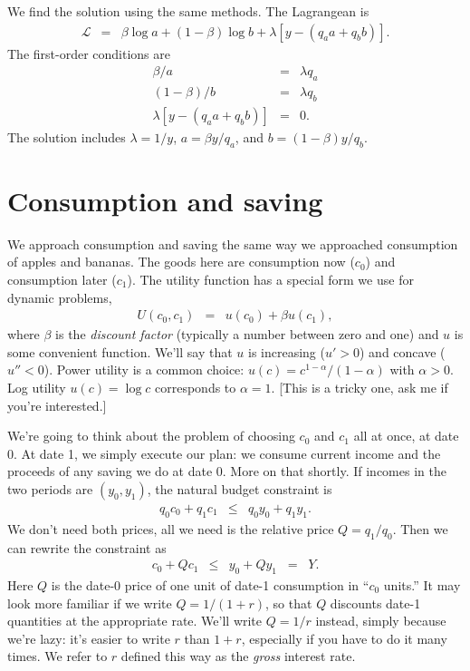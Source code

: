 \documentclass[11pt]{article}
\begin{document}
We find the solution using the same methods.
The Lagrangean is
\begin{eqnarray*}
    \mathcal{L} &=& \beta \log a + (1-\beta) \log b
            + \lambda \left[ y - (q_a a + q_b b) \right] .
\end{eqnarray*}
The first-order conditions are
\begin{eqnarray*}
        \beta / a &=& \lambda q_a \\
        (1-\beta) / b &=& \lambda q_b \\
   \lambda \left[ y - (q_a a + q_b b) \right] &=& 0 .
\end{eqnarray*}
The solution includes $\lambda = 1/y $,
$ a = \beta y/q_a $, and $b = (1-\beta) y /q_b $.


\section{Consumption and saving}

We approach consumption and saving the same way we approached
consumption of apples and bananas.
The goods here are consumption now ($c_0$)
and consumption later ($c_1$).
The utility function has a special form we use for dynamic
problems,
\begin{eqnarray}
    U(c_0,c_1) &=& u(c_0) + \beta u(c_1) ,
    \label{eq:utility-2period}
\end{eqnarray}
where $\beta$ is the {\it discount factor\/} (typically a number between zero and one)
and $u$ is some convenient function.
We'll say that $u$ is increasing ($u' > 0$) and concave ($u'' < 0$).
Power utility is a common choice:
$u(c) = c^{1-\alpha}/(1-\alpha)$ with $\alpha > 0$.
Log utility $u(c) = \log c$ corresponds to $\alpha = 1$.
[This is a tricky one, ask me if you're interested.]

We're going to think about the problem of choosing
$c_0$ and $c_1$ all at once, at date 0.
At date 1, we simply execute our plan:
we consume current income and the proceeds of any saving we do at date 0.
More on that shortly.
If incomes in the two periods are $(y_0,y_1)$,
the natural budget constraint is
\begin{eqnarray*}
   q_0 c_0 + q_1 c_1 &\leq& q_0 y_0 + q_1 y_1  .
\end{eqnarray*}
We don't need both prices, all we need
is the relative price $Q = q_1/q_0$.
Then we can rewrite the constraint as
\begin{eqnarray}
    c_0 + Q c_1 &\leq& y_0 + Q y_1  \;\;=\;\; Y .
    \label{eq:budget-2period}
\end{eqnarray}
Here $Q$ is the date-0 price of one unit of date-1 consumption in ``$c_0$ units.''
It may look more familiar if we write $Q = 1/(1+r)$, so that
$Q$ discounts date-1 quantities at the appropriate rate.
We'll write $Q = 1/r$ instead, simply because we're lazy:
it's easier to write $r$ than $1+r$, especially if you have
to do it many times.
We refer to $r$ defined this way as the {\it gross\/} interest rate.
\end{document}
